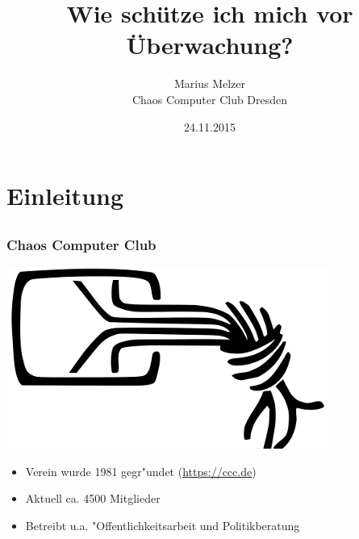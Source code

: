\documentclass[12pt]{beamer}
\title{Wie schütze ich mich vor Überwachung?}
\author{\small Marius Melzer\\\large Chaos Computer Club Dresden}
\date{24.11.2015}
\begin{document}
\maketitle

\section{Einleitung}
\subsection{}

\begin{frame}
    \frametitle{Chaos Computer Club}
    \begin{center}
	\includegraphics[height=0.2\textheight]{img/chaosknoten.png}
    \end{center}	
    \begin{itemize}
      \item<1-> Verein wurde 1981 gegr"undet (\url{https://ccc.de})          
      \item<2-> Aktuell ca. 4500 Mitglieder
      \item<3-> Betreibt u.a. "Offentlichkeitsarbeit und Politikberatung      
    \end{itemize}
\end{frame}
\end{document}
